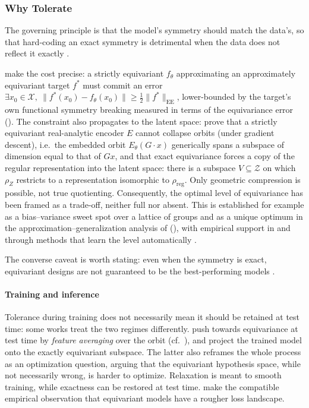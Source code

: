 \documentclass[mathematics,review,submit,moreauthors]{Definitions/mdpi}
\begin{document}
\subsubsection{Why Tolerate}\label{sec:approx-why-tolerate}
The governing principle is that the model's symmetry should match the data's, so that hard-coding an exact symmetry is detrimental when the data does not reflect it exactly \citep{zhou2021,finzi2021anips,elsayed2020p3icml}.

\citet{wang2022p3icml} make the cost precise: a strictly equivariant $f_\theta$ approximating an approximately equivariant target $f^*$ must commit an error $\exists x_0\in \mathcal{X},\ \|f^*(x_0)-f_\theta(x_0)\|\ge \tfrac12\|f^*\|_{\mathrm{EE}}$, lower-bounded by the target's own functional symmetry breaking measured in terms of the equivariance error ().
The constraint also propagates to the latent space: \citet{ali2026} prove that a strictly equivariant real-analytic encoder $E$ cannot collapse orbits (under gradient descent), i.e.\ the embedded orbit $E_\theta(G\cdot x)$ generically spans a subspace of dimension equal to that of $G x$, and that exact equivariance forces a copy of the regular representation into the latent space: there is a subspace $V\subseteq\mathcal{Z}$ on which $\rho_Z$ restricts to a representation isomorphic to $\rho_{\mathrm{reg}}$.
Only geometric compression is possible, not true quotienting.
Consequently, the optimal level of equivariance has been framed as a trade-off, neither full nor absent.
This is established for example as a bias--variance sweet spot over a lattice of groups \citep{huang2023} and as a unique optimum in the approximation--generalization analysis of \citet{petrache2023} (), with empirical support in \citep{wang2022p3icml,wang2024p4icml} and through methods that learn the level automatically \citep{ouderaa2022}.

\begin{Remark}
    The converse caveat is worth stating: even when the symmetry is exact, equivariant designs are not guaranteed to be the best-performing models \citep{lawrence2026,rygiel2026}.
\end{Remark}

\paragraph{Training and inference}
Tolerance during training does not necessarily mean it should be retained at test time: some works treat the two regimes differently.
\citet{escriche2025} push towards equivariance at test time by \emph{feature averaging} over the orbit (cf.\ ), and \citet{pertigkiozoglou2024} project the trained model onto the exactly equivariant subspace.
The latter also reframes the whole process as an optimization question, arguing that the equivariant hypothesis space, while not necessarily wrong, is harder to optimize.
Relaxation is meant to smooth training, while exactness can be restored at test time.
\citet{elhag2026} make the compatible empirical observation that equivariant models have a rougher loss landscape.
\end{document}
